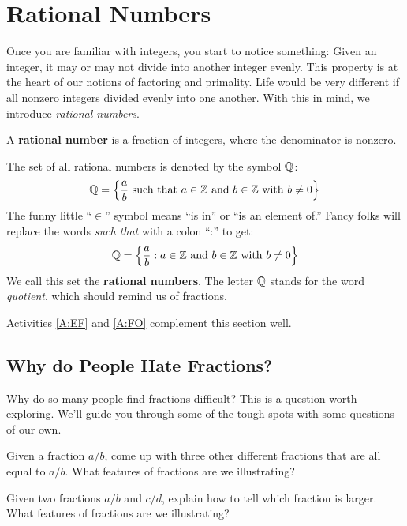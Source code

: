 \section{Rational Numbers}


Once you are familiar with integers, you start to notice something:
Given an integer, it may or may not divide into another integer
evenly. This property is at the heart of our notions of factoring and
primality. Life would be very different if all nonzero integers
divided evenly into one another. With this in mind, we introduce
\textit{rational numbers}.

\begin{definition} 
A \textbf{rational number} is a fraction of
integers, where the denominator is nonzero.
\end{definition}

The set of all rational numbers is denoted by the symbol $\mathbb Q$:
\[
      \Q = \left\{\frac{a}{b}\text{ such that $a\in\Z$ and $b\in\Z$ with $b\ne 0$}\right\}\index{Q@$\Q$}\index{e@$\in$}
\]
The funny little ``$\in$'' symbol means ``is in'' or ``is an element of.'' Fancy folks will replace the words \textit{such that} with a colon
``:'' to get:
\[
 \mathbb Q = \left\{\frac{a}{b}:\text{$a\in\mathbb Z$ and $b\in\mathbb Z$ with $b\ne 0$}\right\}
\]
We call this set the \textbf{rational numbers}.  The letter $\mathbb Q$
stands for the word \textit{quotient}, which should remind us of
fractions. 

\begin{activitynote}
Activities \ref{A:EF} and \ref{A:FO} complement this section well.  
\end{activitynote}


\subsection{Why do People Hate Fractions?}

Why do so many people find fractions difficult? This is a question
worth exploring. We'll guide you through some of the tough spots with
some questions of our own.

\begin{question}
Given a fraction $a/b$, come up with three other different fractions
that are all equal to $a/b$. What features of fractions are we
illustrating?
\end{question}
\QM

\begin{question}
Given two fractions $a/b$ and $c/d$, explain how to tell which
fraction is larger. What features of fractions are we illustrating?
\end{question}
\QM

